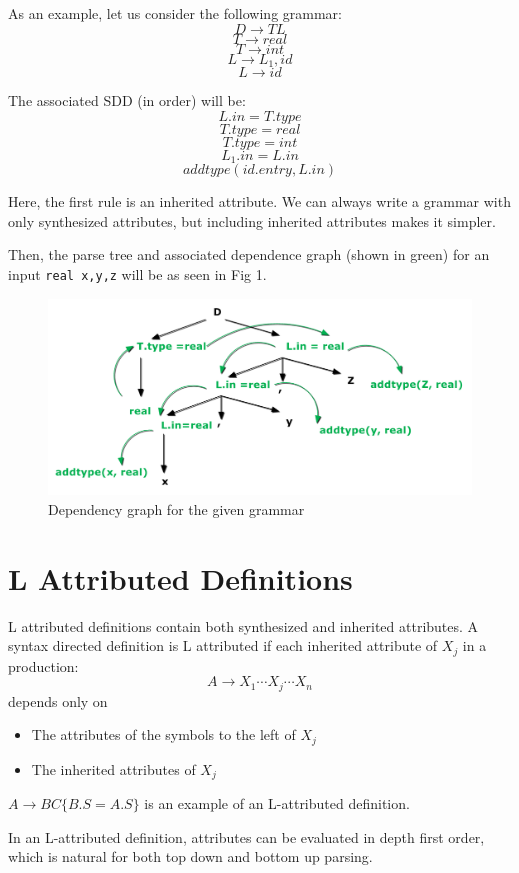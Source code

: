 \documentclass[12pt,letterpaper]{book}
\theoremstyle{definition}
\begin{document}
As an example, let us consider the following grammar:
\[D \rightarrow TL\]
\[T \rightarrow real\]
\[T \rightarrow int\]
\[L \rightarrow L_1,id\]
\[L \rightarrow id\]

The associated SDD (in order) will be:
\[L.in = T.type\]
\[T.type = real\]
\[T.type = int\]
\[L_1.in = L.in\]
\[addtype(id.entry,L.in)\]

Here, the first rule is an inherited attribute. We can always write a grammar with only synthesized attributes, but including inherited attributes makes it simpler.

Then, the parse tree and associated dependence graph (shown in green) for an input \texttt{real x,y,z} will be as seen in Fig 1.

\begin{figure}[htpb]
  \centering
  \includegraphics[width=0.8\linewidth]{./assets/dep_graph_eg.png}
  \caption{Dependency graph for the given grammar}%
  \label{fig:}
\end{figure}

\section{L Attributed Definitions}

L attributed definitions contain both synthesized and inherited attributes. A syntax directed definition is L attributed if each inherited attribute of $X_j$ in a production:
\[A \rightarrow X_1 \cdots X_j \cdots X_n\]
depends only on
\begin{itemize}
  \item The attributes of the symbols to the left of $X_j$
    \item The inherited attributes of $X_j$
\end{itemize}

$A \rightarrow BC \{B.S = A.S\}$ is an example of an L-attributed definition.

In an L-attributed definition, attributes can be evaluated in depth first order, which is natural for both top down and bottom up parsing.
\end{document}
